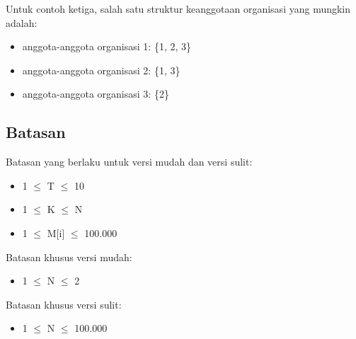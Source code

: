 \documentclass[../main_problemset.tex]{subfiles} %
\begin{document}
Untuk contoh ketiga, salah satu struktur keanggotaan organisasi yang mungkin adalah:

\begin{itemize}
	\item anggota-anggota organisasi 1: \{1, 2, 3\}
	\item anggota-anggota organisasi 2: \{1, 3\}
	\item anggota-anggota organisasi 3: \{2\}
\end{itemize}

\subsection*{Batasan}

\begin{minipage}[t]{0.47\textwidth}

Batasan yang berlaku untuk versi mudah dan versi sulit:

\begin{itemize}
	\item 1 $ \leq $ T $ \leq $ 10
	\item 1 $ \leq $ K $ \leq $ N
	\item 1 $ \le $ M[i] $ \le $ 100.000
\end{itemize}
\end{minipage}
\begin{minipage}[t]{0.06\textwidth}
	\hfill
\end{minipage}
\begin{minipage}[t]{0.47\textwidth}
	Batasan khusus versi mudah:
	\begin{itemize}
		\item 1 $ \le $ N $ \le $ 2
	\end{itemize}
	
	\vspace{.2cm}
	
	Batasan khusus versi sulit:
	\begin{itemize}
		\item 1 $ \le $ N $ \le $ 100.000
	\end{itemize}
\end{minipage}
\end{document}
